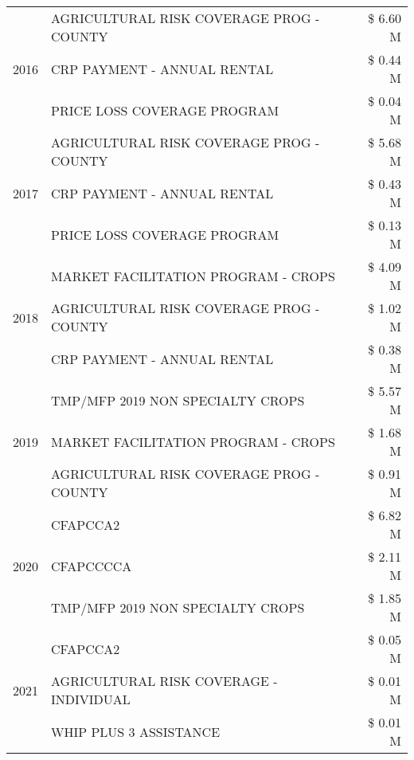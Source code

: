 \begin{tabular}{llr}
\cline{1-3}
\multirow[t]{3}{*}{2016} & AGRICULTURAL RISK COVERAGE PROG - COUNTY & \$ 6.60 M \\
 & CRP PAYMENT - ANNUAL RENTAL & \$ 0.44 M \\
 & PRICE LOSS COVERAGE PROGRAM & \$ 0.04 M \\
\cline{1-3}
\multirow[t]{3}{*}{2017} & AGRICULTURAL RISK COVERAGE PROG - COUNTY & \$ 5.68 M \\
 & CRP PAYMENT - ANNUAL RENTAL & \$ 0.43 M \\
 & PRICE LOSS COVERAGE PROGRAM & \$ 0.13 M \\
\cline{1-3}
\multirow[t]{3}{*}{2018} & MARKET FACILITATION PROGRAM - CROPS & \$ 4.09 M \\
 & AGRICULTURAL RISK COVERAGE PROG - COUNTY & \$ 1.02 M \\
 & CRP PAYMENT - ANNUAL RENTAL & \$ 0.38 M \\
\cline{1-3}
\multirow[t]{3}{*}{2019} & TMP/MFP 2019 NON SPECIALTY CROPS & \$ 5.57 M \\
 & MARKET FACILITATION PROGRAM - CROPS & \$ 1.68 M \\
 & AGRICULTURAL RISK COVERAGE PROG - COUNTY & \$ 0.91 M \\
\cline{1-3}
\multirow[t]{3}{*}{2020} & CFAPCCA2 & \$ 6.82 M \\
 & CFAPCCCCA & \$ 2.11 M \\
 & TMP/MFP 2019 NON SPECIALTY CROPS & \$ 1.85 M \\
\cline{1-3}
\multirow[t]{3}{*}{2021} & CFAPCCA2 & \$ 0.05 M \\
 & AGRICULTURAL RISK COVERAGE - INDIVIDUAL & \$ 0.01 M \\
 & WHIP PLUS 3 ASSISTANCE & \$ 0.01 M \\
\cline{1-3}
\bottomrule
\end{tabular}
